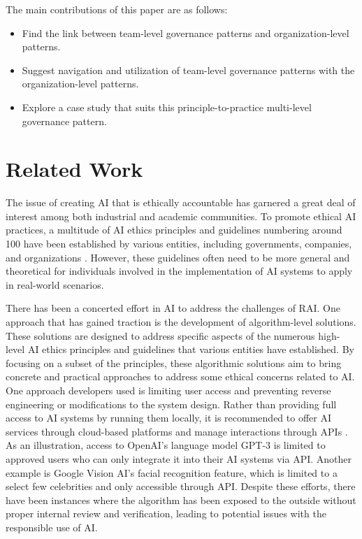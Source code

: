 \documentclass[conference]{IEEEtran}
\begin{document}
The main contributions of this paper are as follows:
\begin{itemize}
\item Find the link between team-level governance patterns and organization-level patterns.
\item Suggest navigation and utilization of team-level governance patterns with the organization-level patterns.
\item Explore a case study that suits this principle-to-practice multi-level governance pattern.
\end{itemize}
\smallskip

\section{Related Work}
The issue of creating AI that is ethically accountable has garnered a great deal of interest among both industrial and academic communities. To promote ethical AI practices, a multitude of AI ethics principles and guidelines numbering around 100 have been established by various entities, including governments, companies, and organizations \cite{GlobalLandscape}. 
However, these guidelines often need to be more general and theoretical for individuals involved in the implementation of AI systems to apply in real-world scenarios.

There has been a concerted effort in AI to address the challenges of RAI. One approach that has gained traction is the development of algorithm-level solutions. 
These solutions are designed to address specific aspects of the numerous high-level AI ethics principles and guidelines that various entities have established. 
By focusing on a subset of the principles, these algorithmic solutions aim to bring concrete and practical approaches to address some ethical concerns related to AI. 
One approach developers used is limiting user access and preventing reverse engineering or modifications to the system design. 
Rather than providing full access to AI systems by running them locally, it is recommended to offer AI services through cloud-based platforms and manage interactions through APIs \cite{TobyAPI}. 
As an illustration, access to OpenAI's language model GPT-3 is limited to approved users who can only integrate it into their AI systems via API. Another example is Google Vision AI's facial recognition feature, which is limited to a select few celebrities and only accessible through API. Despite these efforts, there have been instances where the algorithm has been exposed to the outside without proper internal review and verification, leading to potential issues with the responsible use of AI.
\end{document}
